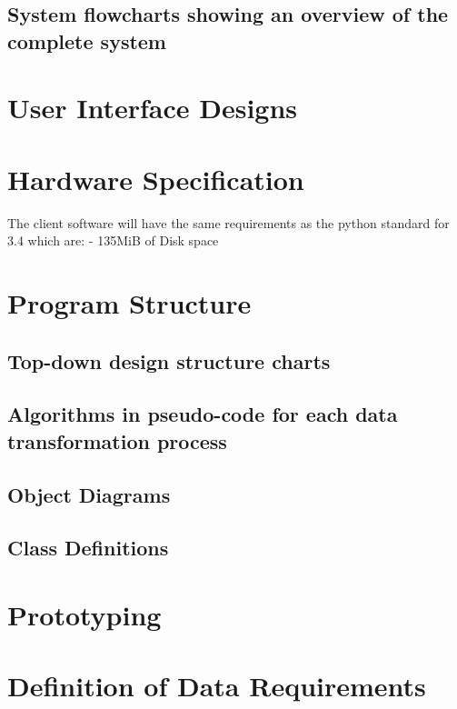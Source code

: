 \subsection{System flowcharts showing an overview of the complete system}

\section{User Interface Designs}


\section{Hardware Specification}
	The client software will have the same requirements as the python standard for 3.4 which are:
	- 135MiB of Disk space


\section{Program Structure}

\subsection{Top-down design structure charts}


\subsection{Algorithms in pseudo-code for each data transformation process}


\subsection{Object Diagrams}


\subsection{Class Definitions}

\section{Prototyping}

\section{Definition of Data Requirements}

